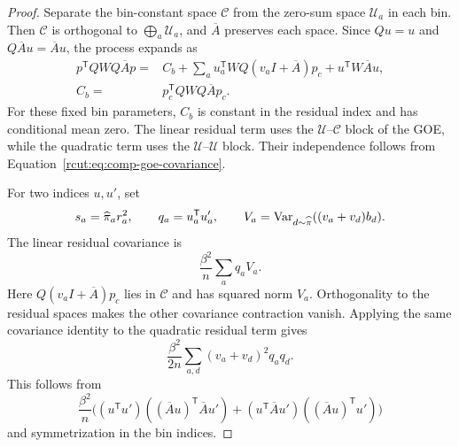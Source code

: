 \begin{proof}
 Separate the bin-constant space $\mathcal C$ from the zero-sum space
 $\mathcal U_a$ in each bin.  Then $\mathcal C$ is orthogonal to
 $\bigoplus_a\mathcal U_a$, and $\overline A$ preserves each space.
 Since $Qu=u$ and $Q\overline A u=\overline A u$, the process expands as
 \begin{align*}
 p^{\mathsf T}QWQ\overline A p
  ={}&C_{b}+
       \sum_a u_a^{\mathsf T}WQ(v_aI+\overline A)p_c
       +u^{\mathsf T}W\overline A u,\\
 C_b={}&p_c^{\mathsf T}QWQ\overline A p_c.
 \end{align*}
 For these fixed bin parameters, $C_b$ is constant in the residual
 index and has conditional mean zero.  The linear residual term uses
 the $\mathcal U$--$\mathcal C$ block of the GOE, while the quadratic
 term uses the $\mathcal U$--$\mathcal U$ block.  Their independence
 follows from Equation~\eqref{rcut:eq:comp-goe-covariance}.

 For two indices $u,u'$, set
 \[
  s_a=\widehat\pi_a r_a^2,
  \qquad q_a=u_a^{\mathsf T}u'_a,
  \qquad V_a=\operatorname{Var}_{d\sim\widehat\pi}((v_a+v_d)b_d).
 \]
 The linear residual covariance is
 \begin{equation}
  \frac{\beta^2}{n}\sum_a q_a V_a.
  \label{rcut:eq:comp-linear-covariance}
 \end{equation}
 Here $Q(v_aI+\overline A)p_c$ lies in $\mathcal C$ and has squared
 norm $V_a$.  Orthogonality to the residual spaces makes the other
 covariance contraction vanish.  Applying the same covariance identity
 to the quadratic residual term gives
 \begin{equation}
  \frac{\beta^2}{2n}\sum_{a,d}(v_a+v_d)^2q_aq_d.
  \label{rcut:eq:comp-quadratic-covariance}
 \end{equation}
 This follows from
 \[
  \frac{\beta^2}{n}
   \bigl((u^{\mathsf T}u')
          ((\overline A u)^{\mathsf T}\overline A u')
       +(u^{\mathsf T}\overline A u')
          ((\overline A u)^{\mathsf T}u')\bigr)
 \]
 and symmetrization in the bin indices.


\end{proof}
